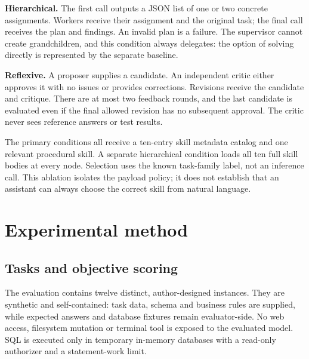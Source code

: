 \textbf{Hierarchical.} The first call outputs a JSON list of one or two concrete assignments. Workers receive their assignment and the original task; the final call receives the plan and findings. An invalid plan is a failure. The supervisor cannot create grandchildren, and this condition always delegates: the option of solving directly is represented by the separate baseline.

\textbf{Reflexive.} A proposer supplies a candidate. An independent critic either approves it with no issues or provides corrections. Revisions receive the candidate and critique. There are at most two feedback rounds, and the last candidate is evaluated even if the final allowed revision has no subsequent approval. The critic never sees reference answers or test results.

The primary conditions all receive a ten-entry skill metadata catalog and one relevant procedural skill. A separate hierarchical condition loads all ten full skill bodies at every node. Selection uses the known task-family label, not an inference call. This ablation isolates the payload policy; it does not establish that an assistant can always choose the correct skill from natural language.

\section{Experimental method}
\subsection{Tasks and objective scoring}
The evaluation contains twelve distinct, author-designed instances. They are synthetic and self-contained: task data, schema and business rules are supplied, while expected answers and database fixtures remain evaluator-side. No web access, filesystem mutation or terminal tool is exposed to the evaluated model. SQL is executed only in temporary in-memory databases with a read-only authorizer and a statement-work limit.

